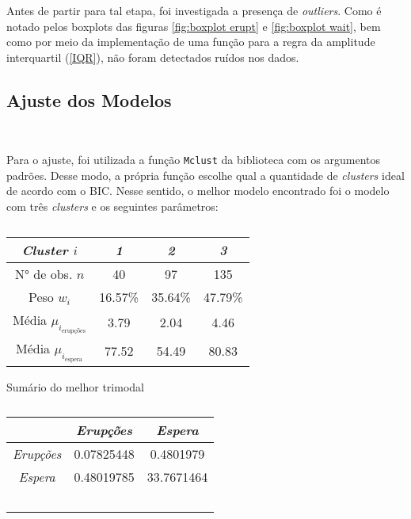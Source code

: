 \documentclass[12pt]{article}
\begin{document}
Antes de partir para tal etapa, foi investigada a presença de \textit{outliers}. Como é notado pelos boxplots das figuras \ref{fig:boxplot erupt} e \ref{fig:boxplot wait}, bem como por meio da implementação de uma função para a regra da amplitude interquartil (\ref{IQR}), não foram detectados ruídos nos dados.

\subsection{Ajuste dos Modelos}

\

Para o ajuste, foi utilizada a função \texttt{Mclust} da biblioteca com os argumentos padrões. Desse modo, a própria função escolhe qual a quantidade de \textit{clusters} ideal de acordo com o BIC. Nesse sentido, o melhor modelo encontrado foi o modelo com três \textit{clusters} e os seguintes parâmetros:

\begin{table}[H]
    \begin{minipage}{0.55\textwidth}
        \centering
        \begin{tabular}{c|ccc}
        \hline
        \textit{Cluster $i$} & \textit{1} & \textit{2} & \textit{3} \\
        \hline
        N° de obs. $n$ & 40 & 97 & 135 \\
        Peso $w_i$  & 16.57\% & 35.64\% & 47.79\% \\
        Média $\mu_{i_\text{erupções}}$ & 3.79 & 2.04 & 4.46 \\
        Média $\mu_{i_\text{espera}}$ & 77.52 & 54.49 & 80.83 \\
        \hline
        \end{tabular}
        \caption{Sumário do melhor trimodal}\label{summary1}
    \end{minipage}%
    \begin{minipage}{0.55\textwidth}
        \centering
        \begin{tabular}{c|cc}
        {} & \textit{Erupções} & \textit{Espera} \\
        \hline
        \textit{Erupções} & 0.07825448 & 0.4801979 \\
        \textit{Espera} & 0.48019785 & 33.7671464 \\
        \hline
        \
        \end{tabular}
        \caption{}\label{cov1}
    \end{minipage}%
\end{table}
\end{document}
